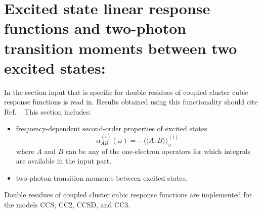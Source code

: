 
\section{Excited state linear response functions and
         two-photon transition moments between two excited states:
         }
\label{sec:ccexlr}

In the  section input that is specific for 
double residues of coupled cluster cubic response functions 
is read in.
Results obtained using this functionality should cite
Ref.~\cite{Haettig:EXCITED,Haettig:EXLR}. 
This section includes:
\begin{itemize}
\item frequency-dependent second-order properties of excited states
      $$ \alpha^{(i)}_{AB}(\omega) = 
         -\langle\langle A; B\rangle\rangle^{(i)}_\omega $$
      where $A$ and $B$ can be any of the one-electron operators
      for which integrals  are available in the 
      input part.
\item two-photon transition moments between excited states.
\end{itemize}
Double residues of coupled cluster cubic response functions are
implemented for the models CCS, CC2, CCSD, and CC3.

\begin{center}
\end{center}

